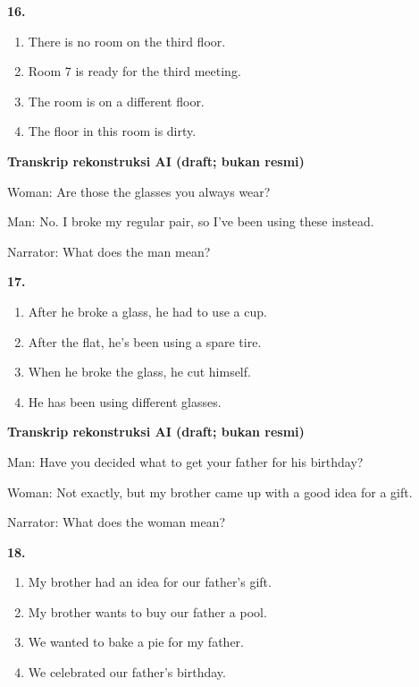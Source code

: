 \documentclass[12pt]{article}
\begin{document}
\noindent\textbf{16.}
\begin{enumerate}[label=(\Alph*),leftmargin=*,itemsep=0.2em]
\item There is no room on the third floor.
\item Room 7 is ready for the third meeting.
\item The room is on a different floor.
\item The floor in this room is dirty.
\end{enumerate}
\par
\vspace{0.25\baselineskip}
\begin{exampleblock}
\textbf{Transkrip rekonstruksi AI (draft; bukan resmi)}\par
Woman: Are those the glasses you always wear?\par
Man: No. I broke my regular pair, so I've been using these instead.\par
Narrator: What does the man mean?\par
\end{exampleblock}
\noindent\textbf{17.}
\begin{enumerate}[label=(\Alph*),leftmargin=*,itemsep=0.2em]
\item After he broke a glass, he had to use a cup.
\item After the flat, he's been using a spare tire.
\item When he broke the glass, he cut himself.
\item He has been using different glasses.
\end{enumerate}
\par
\vspace{0.25\baselineskip}
\begin{exampleblock}
\textbf{Transkrip rekonstruksi AI (draft; bukan resmi)}\par
Man: Have you decided what to get your father for his birthday?\par
Woman: Not exactly, but my brother came up with a good idea for a gift.\par
Narrator: What does the woman mean?\par
\end{exampleblock}
\noindent\textbf{18.}
\begin{enumerate}[label=(\Alph*),leftmargin=*,itemsep=0.2em]
\item My brother had an idea for our father's gift.
\item My brother wants to buy our father a pool.
\item We wanted to bake a pie for my father.
\item We celebrated our father's birthday.
\end{enumerate}
\end{document}
